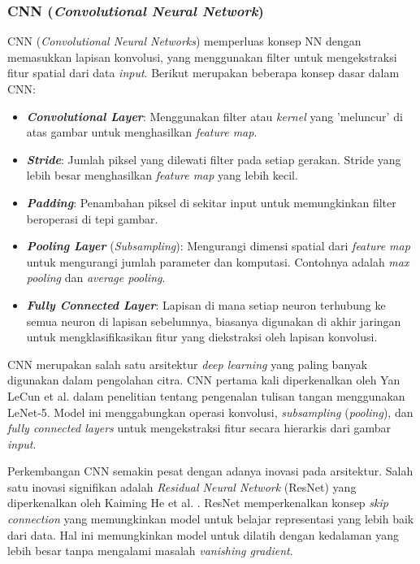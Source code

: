  \subsubsection{CNN (\emph{Convolutional Neural Network})}
 CNN (\emph{Convolutional Neural Networks}) memperluas konsep NN dengan memasukkan lapisan konvolusi, yang menggunakan filter untuk mengekstraksi fitur spatial dari data \emph{input}. Berikut merupakan beberapa konsep dasar dalam CNN:
 \begin{itemize}[nolistsep] 
   \item \textbf{\emph{Convolutional Layer}}: Menggunakan filter atau \emph{kernel} yang 'meluncur' di atas gambar untuk menghasilkan \emph{feature map}.
   \item \textbf{\emph{Stride}}: Jumlah piksel yang dilewati filter pada setiap gerakan. Stride yang lebih besar menghasilkan \emph{feature map} yang lebih kecil.
   \item \textbf{\emph{Padding}}: Penambahan piksel di sekitar input untuk memungkinkan filter beroperasi di tepi gambar.
   \item \textbf{\emph{Pooling Layer}} (\emph{Subsampling}): Mengurangi dimensi spatial dari \emph{feature map} untuk mengurangi jumlah parameter dan komputasi. Contohnya adalah \emph{max pooling} dan \emph{average pooling}.
   \item \textbf{\emph{Fully Connected Layer}}: Lapisan di mana setiap neuron terhubung ke semua neuron di lapisan sebelumnya, biasanya digunakan di akhir jaringan untuk mengklasifikasikan fitur yang diekstraksi oleh lapisan konvolusi.
 \end{itemize} 

 CNN merupakan salah satu arsitektur \emph{deep learning} yang paling banyak digunakan dalam pengolahan citra. CNN pertama kali diperkenalkan oleh Yan LeCun et al. \parencite*{yannlecun1998} dalam penelitian tentang pengenalan tulisan tangan menggunakan LeNet-5. Model ini menggabungkan operasi konvolusi, \emph{subsampling} (\emph{pooling}), dan \emph{fully connected layers} untuk mengekstraksi fitur secara hierarkis dari gambar \emph{input}.
 
Perkembangan CNN semakin pesat dengan adanya inovasi pada arsitektur. Salah satu inovasi signifikan adalah \emph{Residual Neural Network} (ResNet) yang diperkenalkan oleh Kaiming He et al. \parencite*{kaiminghe2015}. ResNet memperkenalkan konsep \emph{skip connection} yang memungkinkan model untuk belajar representasi yang lebih baik dari data. Hal ini memungkinkan model untuk dilatih dengan kedalaman yang lebih besar tanpa mengalami masalah \emph{vanishing gradient}.
 
